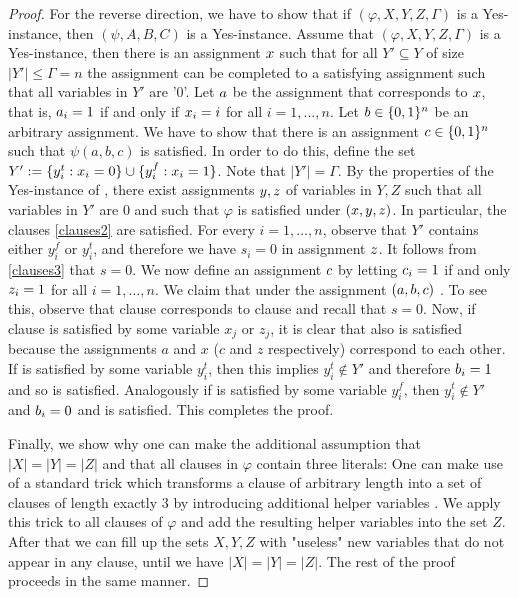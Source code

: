 \begin{proof}
For the reverse direction, we have to show that if $(\varphi,X,Y,Z,\Gamma)$ is a Yes-instance, then $(\psi,A,B,C)$ is a Yes-instance. 
Assume that $(\varphi,X,Y,Z,\Gamma)$ is a Yes-instance, then there is an assignment $x$ such that for all $Y' \subseteq Y$ of size $|Y'| \leq \Gamma = n$ the assignment can be completed to a satisfying assignment such that all variables in $Y'$ are '0'.
Let $a$ be the assignment that corresponds to $x$, that is, $a_i = 1$ if and only if $x_i = i$ for all $i=1,\dots,n$.
 Let $b \in \{ 0,1 \}^n$ be an arbitrary assignment. 
 We have to show that there is an assignment $c \in \{ 0,1 \}^n$ such that $\psi(a,b,c)$ is satisfied. 
 In order to do this, define the set $Y' := \{ y_i^t : x_i = 0 \} \cup \{ y_i^f : x_i = 1 \}$. 
 Note that $|Y'| = \Gamma$. By the properties of the Yes-instance of {\radj}, there exist assignments $y,z$ of variables in $Y,Z$ such that all variables in $Y'$ are 0 and such that $\varphi$ is satisfied under $(x,y,z)$. 
 In particular, the clauses \eqref{clauses2} are satisfied. For every $i=1,\dots,n$, observe that $Y'$ contains either $y_i^f$ or $y_i^t$, and therefore we have $s_i=0$ in assignment $z$. 
 It follows from \eqref{clauses3} that $s=0$. 
 We now define an assignment $c$ by letting $c_i = 1$ if and only $z_i = 1$ for all $i=1,\dots,n$. 
 We claim that under the assignment $(a,b,c)$ .
 To see this, observe that clause  corresponds to clause  and recall that $s=0$.
 Now, if clause  is satisfied by some variable $x_j$ or $z_j$, it is clear that also  is satisfied because the assignments $a$ and $x$ ($c$ and $z$ respectively) correspond to each other.
 If  is satisfied by some variable $y^t_i$, then this implies $y^t_i \not\in Y'$ and therefore $b_i=1$ and so  is satisfied.
  Analogously if  is satisfied by some variable $y^f_i$, then $y^t_i \not\in Y'$ and $b_i=0$ and  is satisfied.
  This completes the proof.
  
Finally, we show why one can make the additional assumption that $|X|=|Y|=|Z|$ and that all clauses in $\varphi$ contain three literals: One can make use of a standard trick which transforms a clause of arbitrary length into a set of clauses of length exactly 3 by introducing additional helper variables \cite{garey1979computers}.
We apply this trick to all clauses of $\varphi$ and add the resulting helper variables into the set $Z$. After that we can fill up the sets $X,Y,Z$ with "useless" new variables that do not appear in any clause, until we have $|X| = |Y| = |Z|$. The rest of the proof proceeds in the same manner.
\end{proof}


